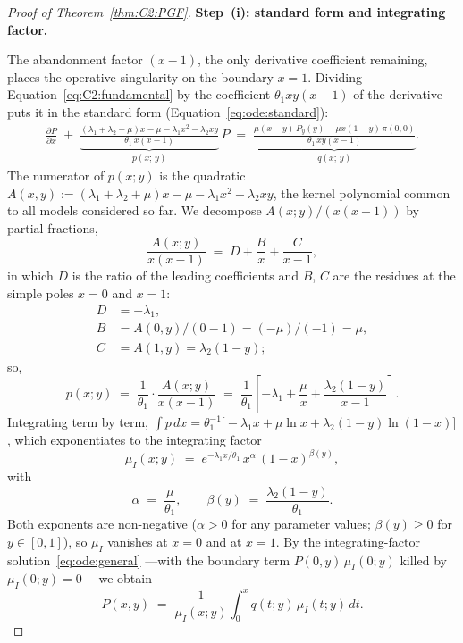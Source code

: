 \begin{proof}[Proof of Theorem~\ref{thm:C2:PGF}]

\medskip\noindent\textbf{Step~(i): standard form and integrating factor.}

The abandonment factor $(x-1)$, the only derivative coefficient remaining, places the operative singularity on the boundary $x=1$. Dividing Equation~\eqref{eq:C2:fundamental} by the coefficient $\theta_1 xy(x-1)$ of the derivative puts it in the standard form (Equation~\eqref{eq:ode:standard}):
\begin{align*}
    \frac{\partial P}{\partial x} \;+\; \underbrace{\frac{(\lambda_1+\lambda_2+\mu)x - \mu - \lambda_1 x^2 - \lambda_2 xy}{\theta_1\,x(x-1)}}_{p(x;\,y)}\,P
    \;=\; \underbrace{\frac{\mu(x-y)\,P_y(y) - \mu x(1-y)\,\pi(0,0)}{\theta_1\,xy(x-1)}}_{q(x;\,y)}.
\end{align*}
The numerator of $p(x;y)$ is the quadratic $A(x,y):=(\lambda_1+\lambda_2+\mu)x-\mu-\lambda_1 x^2-\lambda_2 xy$, the kernel polynomial common to all models considered so far. We decompose $A(x;y)/(x(x-1))$ by partial fractions,
\begin{equation*}
    \frac{A(x;y)}{x(x-1)} \;=\; D + \frac{B}{x} + \frac{C}{x-1},
\end{equation*}
in which $D$ is the ratio of the leading coefficients and $B$, $C$ are the residues at the simple poles $x=0$ and $x=1$:
\begin{align*}
    D &= -\lambda_1, \\
    B &= A(0,y)/(0-1)=(-\mu)/(-1)=\mu, \\
    C &=A(1,y)=\lambda_2(1-y);
\end{align*}
so,
\begin{equation}
    p(x;y) \;=\; \frac{1}{\theta_1} \cdot \frac{A(x;y)}{x(x-1)} \;=\; \frac{1}{\theta_1}\!\left[-\lambda_1 + \frac{\mu}{x} + \frac{\lambda_2(1-y)}{x-1}\right].
    \label{eq:C2:pfd}
\end{equation}
Integrating term by term, $\int p\,dx = \theta_1^{-1}\bigl[-\lambda_1 x + \mu\ln x + \lambda_2(1-y)\ln(1-x)\bigr]$, which exponentiates to the integrating factor
\begin{equation}
    \mu_I(x;y) \;=\; e^{-\lambda_1 x/\theta_1}\, x^{\alpha}\, (1-x)^{\beta(y)},
    \label{eq:C2:integrating_factor}
\end{equation}
with
\begin{equation}
    \alpha \;=\; \frac{\mu}{\theta_1}, \qquad \beta(y) \;=\; \frac{\lambda_2(1-y)}{\theta_1}.
    \label{eq:C2:exponents}
\end{equation}
Both exponents are non-negative ($\alpha>0$ for any parameter values; $\beta(y)\ge0$ for $y\in[0,1]$), so $\mu_I$ vanishes at $x=0$ and at $x=1$. By the integrating-factor solution~\eqref{eq:ode:general} ---with the boundary term $P(0,y)\,\mu_I(0;y)$ killed by $\mu_I(0;y)=0$--- we obtain
\begin{equation}
    P(x,y) \;=\; \frac{1}{\mu_I(x;y)} \int_0^x q(t;y)\,\mu_I(t;y)\,dt.
    \label{eq:C2:Pxy_implicit}
\end{equation}


\end{proof}

